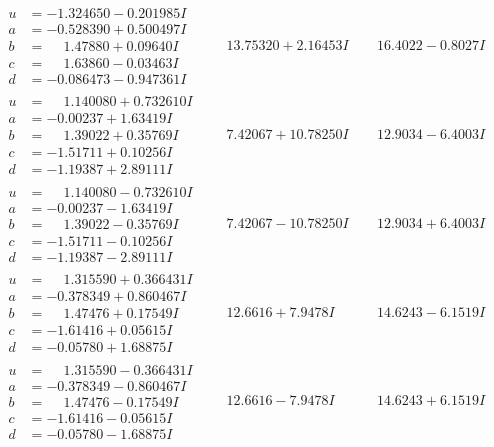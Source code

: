 \documentclass[1p]{elsarticle_modified}
\theoremstyle{definition}
\begin{document}
$$\begin{array}{c|c|c}
\begin{aligned}
u &= -1.324650 - 0.201985 I \\
a &= -0.528390 + 0.500497 I \\
b &= \phantom{-}1.47880 + 0.09640 I \\
c &= \phantom{-}1.63860 - 0.03463 I \\
d &= -0.086473 - 0.947361 I\end{aligned}
 & \phantom{-}13.75320 + 2.16453 I & \phantom{-}16.4022 - 0.8027 I \\ \hline\begin{aligned}
u &= \phantom{-}1.140080 + 0.732610 I \\
a &= -0.00237 + 1.63419 I \\
b &= \phantom{-}1.39022 + 0.35769 I \\
c &= -1.51711 + 0.10256 I \\
d &= -1.19387 + 2.89111 I\end{aligned}
 & \phantom{-}7.42067 + 10.78250 I & \phantom{-}12.9034 - 6.4003 I \\ \hline\begin{aligned}
u &= \phantom{-}1.140080 - 0.732610 I \\
a &= -0.00237 - 1.63419 I \\
b &= \phantom{-}1.39022 - 0.35769 I \\
c &= -1.51711 - 0.10256 I \\
d &= -1.19387 - 2.89111 I\end{aligned}
 & \phantom{-}7.42067 - 10.78250 I & \phantom{-}12.9034 + 6.4003 I \\ \hline\begin{aligned}
u &= \phantom{-}1.315590 + 0.366431 I \\
a &= -0.378349 + 0.860467 I \\
b &= \phantom{-}1.47476 + 0.17549 I \\
c &= -1.61416 + 0.05615 I \\
d &= -0.05780 + 1.68875 I\end{aligned}
 & \phantom{-}12.6616 + 7.9478 I & \phantom{-}14.6243 - 6.1519 I \\ \hline\begin{aligned}
u &= \phantom{-}1.315590 - 0.366431 I \\
a &= -0.378349 - 0.860467 I \\
b &= \phantom{-}1.47476 - 0.17549 I \\
c &= -1.61416 - 0.05615 I \\
d &= -0.05780 - 1.68875 I\end{aligned}
 & \phantom{-}12.6616 - 7.9478 I & \phantom{-}14.6243 + 6.1519 I\\

\end{array}$$
\end{document}

